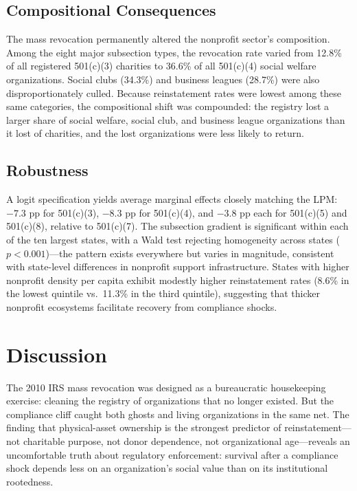 \documentclass[12pt]{article}
\begin{document}


\subsection{Compositional Consequences}

The mass revocation permanently altered the nonprofit sector's composition. Among the eight major subsection types, the revocation rate varied from 12.8\% of all registered 501(c)(3) charities to 36.6\% of all 501(c)(4) social welfare organizations. Social clubs (34.3\%) and business leagues (28.7\%) were also disproportionately culled. Because reinstatement rates were lowest among these same categories, the compositional shift was compounded: the registry lost a larger share of social welfare, social club, and business league organizations than it lost of charities, and the lost organizations were less likely to return.

\subsection{Robustness}

A logit specification yields average marginal effects closely matching the LPM: $-7.3$ pp for 501(c)(3), $-8.3$ pp for 501(c)(4), and $-3.8$ pp each for 501(c)(5) and 501(c)(8), relative to 501(c)(7). The subsection gradient is significant within each of the ten largest states, with a Wald test rejecting homogeneity across states ($p < 0.001$)---the pattern exists everywhere but varies in magnitude, consistent with state-level differences in nonprofit support infrastructure. States with higher nonprofit density per capita exhibit modestly higher reinstatement rates (8.6\% in the lowest quintile vs.\ 11.3\% in the third quintile), suggesting that thicker nonprofit ecosystems facilitate recovery from compliance shocks.

\section{Discussion}

The 2010 IRS mass revocation was designed as a bureaucratic housekeeping exercise: cleaning the registry of organizations that no longer existed. But the compliance cliff caught both ghosts and living organizations in the same net. The finding that physical-asset ownership is the strongest predictor of reinstatement---not charitable purpose, not donor dependence, not organizational age---reveals an uncomfortable truth about regulatory enforcement: survival after a compliance shock depends less on an organization's social value than on its institutional rootedness.
\end{document}
